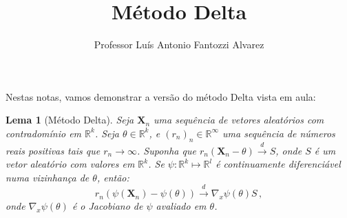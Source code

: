 \documentclass[12pt,a4paper]{article}
\title{Método Delta}
\author{ Professor Luís Antonio Fantozzi Alvarez}
\newtheorem{lemma}{Lema}
\begin{document}
	\maketitle
	
	Nestas notas, vamos demonstrar a versão do método Delta vista em aula:
	
		\begin{lemma}[Método Delta]
		Seja $\boldsymbol{X}_n$ uma sequência de vetores aleatórios com contradomínio em $\mathbb{R}^k$. Seja $\theta \in \mathbb{R}^k$, e $(r_n)_n \in \mathbb{R}^\infty$ uma sequência de números reais positivas tais que $r_n \to \infty$. Suponha que $r_n(\boldsymbol{X}_n - \theta)\overset{d}{\to} S$, onde $S$ é um vetor aleatório com valores em $\mathbb{R}^k$. Se $\psi: \mathbb{R}^k \mapsto \mathbb{R}^l$ é continuamente diferenciável numa vizinhança de $\theta$, então:
		$$r_n(\psi(\boldsymbol{X}_n)-\psi(\theta)) \overset{d}{\to} \nabla_{x}\psi(\theta) S\, ,$$
		onde $\nabla_{x}\psi(\theta)$ é o Jacobiano de $\psi$ avaliado em $\theta$.
	\end{lemma}
\end{document}
